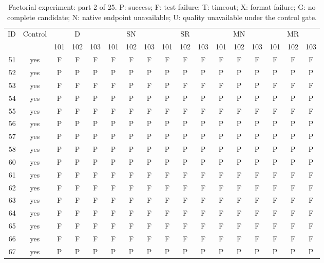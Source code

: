 \begin{table}[p]\centering\footnotesize
\setlength{\tabcolsep}{3pt}
\caption{Factorial experiment: part 2 of 25. P: success; F: test failure; T: timeout; X: format failure; G: no complete candidate; N: native endpoint unavailable; U: quality unavailable under the control gate.}
\begin{tabular*}{\textwidth}{@{\extracolsep{\fill}}rcccccccccccccccc}\toprule
ID & Control & \multicolumn{3}{c}{D} & \multicolumn{3}{c}{SN} & \multicolumn{3}{c}{SR} & \multicolumn{3}{c}{MN} & \multicolumn{3}{c}{MR}\\
\cmidrule(lr){3-5}\cmidrule(lr){6-8}\cmidrule(lr){9-11}\cmidrule(lr){12-14}\cmidrule(lr){15-17}
 & & 101 & 102 & 103 & 101 & 102 & 103 & 101 & 102 & 103 & 101 & 102 & 103 & 101 & 102 & 103\\\midrule
51 & yes & F & F & F & F & F & F & F & F & F & F & F & F & F & F & F\\
52 & yes & P & P & P & P & P & P & P & P & P & P & P & P & P & P & P\\
53 & yes & F & F & F & F & P & F & P & F & F & F & P & P & F & F & F\\
54 & yes & P & P & P & P & P & P & P & P & P & P & P & P & P & P & P\\
55 & yes & F & F & F & F & F & F & F & F & F & F & F & F & F & F & F\\
56 & yes & P & P & P & P & P & P & P & P & P & P & P & P & P & P & P\\
57 & yes & P & P & P & P & P & P & P & P & P & P & P & P & P & P & P\\
58 & yes & P & P & P & P & P & P & P & P & P & P & P & P & P & P & P\\
60 & yes & P & P & P & P & P & P & P & P & P & P & P & P & P & P & P\\
61 & yes & F & F & F & F & F & F & F & F & F & F & F & F & F & F & F\\
62 & yes & F & F & F & F & F & F & F & F & F & F & F & F & F & F & F\\
63 & yes & F & F & F & F & F & F & F & F & F & F & F & F & F & F & F\\
64 & yes & F & F & F & F & F & F & F & F & F & F & F & F & F & F & F\\
65 & yes & F & F & F & F & F & F & F & F & F & F & F & F & F & F & F\\
66 & yes & F & F & F & F & F & F & F & F & F & F & F & F & F & F & F\\
67 & yes & P & P & P & P & P & P & P & P & P & P & P & P & P & P & P\\

\end{tabular*}
\end{table}
